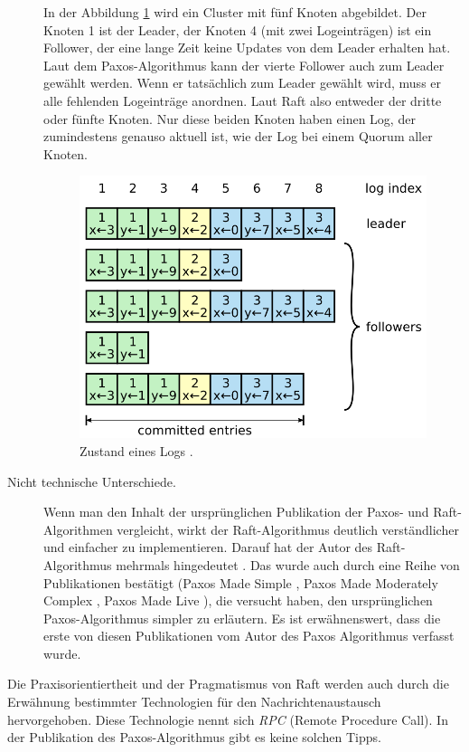 \begin{description}
	In der Abbildung \ref{fig:logstate} wird ein Cluster mit fünf Knoten abgebildet. Der Knoten 1 ist der Leader, der Knoten 4 (mit zwei Logeinträgen) ist ein Follower, der eine lange Zeit keine Updates von dem Leader erhalten hat. Laut dem Paxos-Algorithmus kann der vierte Follower auch zum Leader gewählt werden. Wenn er tatsächlich zum Leader gewählt wird, muss er alle fehlenden Logeinträge anordnen. Laut Raft also entweder der dritte oder fünfte Knoten. Nur diese beiden Knoten haben einen Log, der zumindestens genauso aktuell ist, wie der Log bei einem Quorum aller Knoten.
	
	\begin{figure}
		\centering
		\includegraphics[width=0.7\linewidth]{images/2_log_state}
		\caption{Zustand eines Logs \cite{Ongaro14insearch}.}
		\label{fig:logstate}
	\end{figure}
	
	\item[Nicht technische Unterschiede.] Wenn man den Inhalt der ursprünglichen Publikation der Paxos- und Raft-Algorithmen vergleicht, wirkt der Raft-Algorithmus deutlich verständlicher und einfacher zu implementieren. Darauf hat der Autor des Raft-Algorithmus mehrmals hingedeutet \cite{Ongaro14insearch}. Das wurde auch durch eine Reihe von Publikationen bestätigt (Paxos Made Simple \cite{Lamport2001paxos-made-simple}, Paxos Made Moderately Complex \cite{Renesse15paxosmade}, Paxos Made Live \cite{Chandra07paxosmade}), die versucht haben, den ursprünglichen Paxos-Algorithmus simpler zu erläutern. Es ist erwähnenswert, dass die erste von diesen Publikationen vom Autor des Paxos Algorithmus verfasst wurde.
\end{description}

Die Praxisorientiertheit und der Pragmatismus von Raft werden auch durch die Erwähnung bestimmter Technologien für den Nachrichtenaustausch hervorgehoben. Diese Technologie nennt sich \textit{RPC} (Remote Procedure Call). In der Publikation des Paxos-Algorithmus gibt es keine solchen Tipps.


